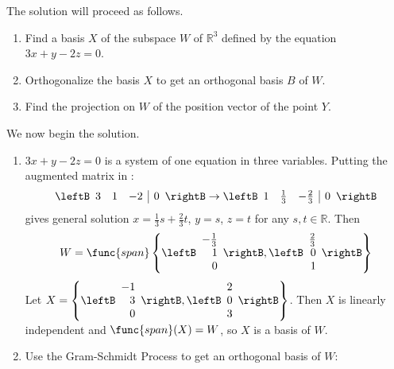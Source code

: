 \begin{solution}
The solution will proceed as follows.
\begin{enumerate}
\item Find a basis $X$ of the subspace $W$ of $\mathbb{R}^3$ defined by
the equation  $3x+y-2z=0$.
\item Orthogonalize the basis $X$ to get an orthogonal basis
$B$ of $W$.
\item Find the projection on $W$ of the position vector of
the point $Y$.
\end{enumerate}

We now begin the solution.
\begin{enumerate}
\item $3x+y-2z=0$ is a system of one equation in three variables.
Putting the augmented matrix in \rref:
\[
\leftB\begin{array}{rrr|r} 3 & 1 & -2 & 0 \end{array}\rightB
\rightarrow
\leftB\begin{array}{rrr|r} 1 & \frac{1}{3} & -\frac{2}{3} & 0 \end{array}\rightB
\]
gives general solution $x=\frac{1}{3}s+\frac{2}{3}t$, $y=s$, $z=t$
for any $s,t\in\mathbb{R}$.
Then  
\[
W=\func{span} \left\{
\leftB\begin{array}{r} -\frac{1}{3} \\ 1 \\ 0 \end{array}\rightB,
\leftB\begin{array}{r} \frac{2}{3} \\ 0 \\ 1 \end{array}\rightB\right\}
\]
Let
$X=\left\{
\leftB\begin{array}{r} -1 \\ 3 \\ 0 \end{array}\rightB,
\leftB\begin{array}{r} 2 \\ 0 \\ 3 \end{array}\rightB\right\}$.
Then $X$ is linearly independent and $\func{span}(X)=W$, so $X$ is a basis of $W$.

\item Use the Gram-Schmidt Process to get an
orthogonal basis of $W$: 



\end{enumerate}
\end{solution}
